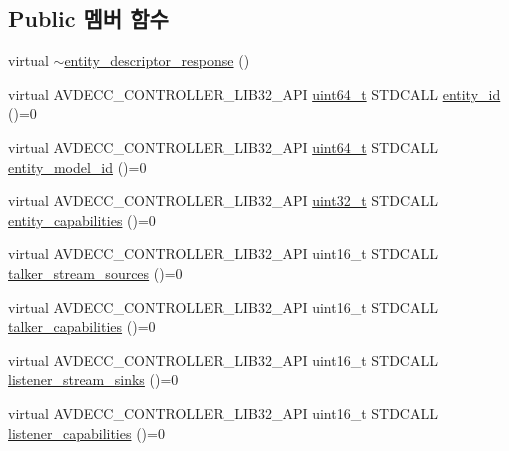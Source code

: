 \subsection*{Public 멤버 함수}
\begin{DoxyCompactItemize}
\item 
virtual \hyperlink{classavdecc__lib_1_1entity__descriptor__response_a33f6dbebb4c4c8bf521f8d0432d5a8be}{$\sim$entity\+\_\+descriptor\+\_\+response} ()
\item 
virtual A\+V\+D\+E\+C\+C\+\_\+\+C\+O\+N\+T\+R\+O\+L\+L\+E\+R\+\_\+\+L\+I\+B32\+\_\+\+A\+PI \hyperlink{parse_8c_aec6fcb673ff035718c238c8c9d544c47}{uint64\+\_\+t} S\+T\+D\+C\+A\+LL \hyperlink{classavdecc__lib_1_1entity__descriptor__response_a3374e7e9d63f8e1756480b16df9bc0c0}{entity\+\_\+id} ()=0
\item 
virtual A\+V\+D\+E\+C\+C\+\_\+\+C\+O\+N\+T\+R\+O\+L\+L\+E\+R\+\_\+\+L\+I\+B32\+\_\+\+A\+PI \hyperlink{parse_8c_aec6fcb673ff035718c238c8c9d544c47}{uint64\+\_\+t} S\+T\+D\+C\+A\+LL \hyperlink{classavdecc__lib_1_1entity__descriptor__response_a68689ddf5ed9995909b3d980af23ffe7}{entity\+\_\+model\+\_\+id} ()=0
\item 
virtual A\+V\+D\+E\+C\+C\+\_\+\+C\+O\+N\+T\+R\+O\+L\+L\+E\+R\+\_\+\+L\+I\+B32\+\_\+\+A\+PI \hyperlink{parse_8c_a6eb1e68cc391dd753bc8ce896dbb8315}{uint32\+\_\+t} S\+T\+D\+C\+A\+LL \hyperlink{classavdecc__lib_1_1entity__descriptor__response_a94d0ea1aebf4f504d143f7a4679c6e73}{entity\+\_\+capabilities} ()=0
\item 
virtual A\+V\+D\+E\+C\+C\+\_\+\+C\+O\+N\+T\+R\+O\+L\+L\+E\+R\+\_\+\+L\+I\+B32\+\_\+\+A\+PI uint16\+\_\+t S\+T\+D\+C\+A\+LL \hyperlink{classavdecc__lib_1_1entity__descriptor__response_a5a93d7a7d491c78d68d0058fa92d61c1}{talker\+\_\+stream\+\_\+sources} ()=0
\item 
virtual A\+V\+D\+E\+C\+C\+\_\+\+C\+O\+N\+T\+R\+O\+L\+L\+E\+R\+\_\+\+L\+I\+B32\+\_\+\+A\+PI uint16\+\_\+t S\+T\+D\+C\+A\+LL \hyperlink{classavdecc__lib_1_1entity__descriptor__response_aed07d99ea1264dcae25f7980cda6e9c5}{talker\+\_\+capabilities} ()=0
\item 
virtual A\+V\+D\+E\+C\+C\+\_\+\+C\+O\+N\+T\+R\+O\+L\+L\+E\+R\+\_\+\+L\+I\+B32\+\_\+\+A\+PI uint16\+\_\+t S\+T\+D\+C\+A\+LL \hyperlink{classavdecc__lib_1_1entity__descriptor__response_abe7ac8090951c2afa1243d56969cb67d}{listener\+\_\+stream\+\_\+sinks} ()=0
\item 
virtual A\+V\+D\+E\+C\+C\+\_\+\+C\+O\+N\+T\+R\+O\+L\+L\+E\+R\+\_\+\+L\+I\+B32\+\_\+\+A\+PI uint16\+\_\+t S\+T\+D\+C\+A\+LL \hyperlink{classavdecc__lib_1_1entity__descriptor__response_a73f2315e3224cd58f2720f50cfa5b684}{listener\+\_\+capabilities} ()=0

\end{DoxyCompactItemize}
